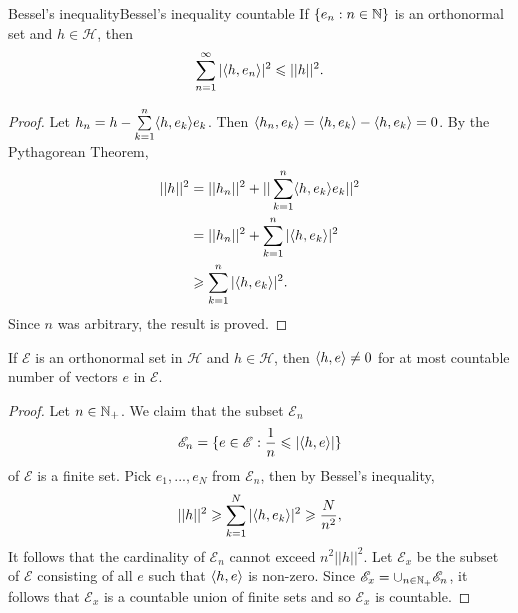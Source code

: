 \begin{proposition}{Bessel's inequality}{Bessel's inequality countable}
    If $\{e_n:n\in\mathbb{N}\}$ is an orthonormal set 
    and $h\in\mathscr{H}$, then 
    \begin{align*}
        \sum\limits_{n=1}^{\infty}|\langle h,e_n\rangle|^2\leqslant ||h||^2.
    \end{align*}
\end{proposition}

\begin{proof}
    Let $h_n=h-\sum\limits_{k=1}^{n}\langle h,e_k\rangle e_k$.
    Then $\langle h_n,e_k\rangle=\langle h,e_k\rangle-\langle h,e_k\rangle=0$.
    By the Pythagorean Theorem,
    \begin{align*}
        ||h||^2 &= ||h_n||^2 +||\sum\limits_{k=1}^{n}\langle h,e_k\rangle e_k||^2\\
                &=||h_n||^2+\sum\limits_{k=1}^{n}|\langle h,e_k\rangle|^2\\
                &\geqslant \sum\limits_{k=1}^{n} |\langle h,e_k\rangle|^2.
    \end{align*}
    Since $n$ was arbitrary, the result is proved.
\end{proof}


\begin{corollary}{}{}
    If $\mathscr{E}$ is an orthonormal set in $\mathscr{H}$ and $h\in\mathscr{H}$,
    then $\langle h,e\rangle\neq 0$ for at most countable number of vectors $e$ in $\mathscr{E}$.
\end{corollary}

\begin{proof}
    Let $n\in\mathbb{N}_+$. We claim that the subset $\mathscr{E}_n$
    \begin{align*}
        \mathscr{E}_n = \{e\in \mathscr{E}: \frac{1}{n}\leqslant|\langle h,e\rangle|\}
    \end{align*} 
    of $\mathscr{E}$ is a finite set. Pick $e_1,...,e_N$ from $\mathscr{E}_n$, then by Bessel's inequality,
    \begin{align*}
        ||h||^2\geqslant \sum\limits_{k=1}^{N}|\langle h,e_k\rangle|^2\geqslant \frac{N}{n^2},
    \end{align*}
    It follows that the cardinality of $\mathscr{E}_n$ cannot exceed $n^2||h||^2$.
    Let $\mathscr{E}_x$ be the subset of $\mathscr{E}$ consisting of all $e$ such that 
    $\langle h,e\rangle$ is non-zero.
    Since $\mathscr{E}_x=\cup_{n\in\mathbb{N}_+} \mathscr{E}_n$, 
    it follows that $\mathscr{E}_x$ is a countable union of finite sets and so $\mathscr{E}_x$ is countable. 
\end{proof}

